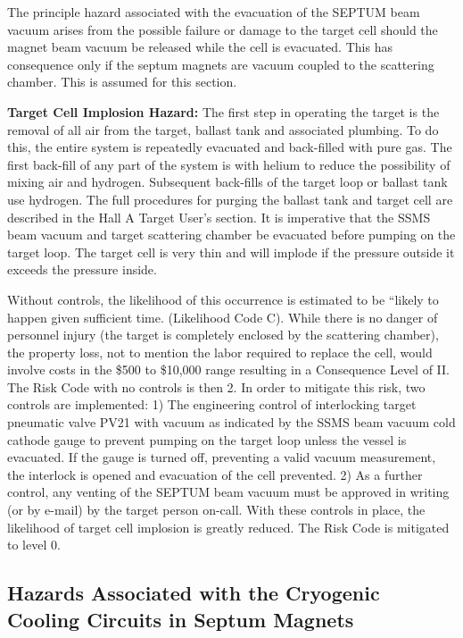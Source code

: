 The principle hazard associated with the evacuation of the SEPTUM beam vacuum arises from the possible 
failure or damage to the target cell should the magnet beam vacuum be released while the cell is evacuated. 
This has consequence only if the septum magnets are vacuum coupled to the scattering chamber. This is 
assumed for this section. 

{\bf Target Cell Implosion Hazard:}
The first step in operating the target is the removal of all air from the target, ballast tank and
associated plumbing. To do this, the entire system is repeatedly evacuated and back-filled with pure 
gas. The first back-fill of any part of the system is with helium to reduce the possibility of mixing 
air and hydrogen. Subsequent back-fills of the target loop or ballast tank use hydrogen. The full 
procedures for purging the ballast tank and target cell are described in the Hall A Target User's section. 
It is imperative that the SSMS beam vacuum and target scattering chamber be evacuated before pumping on 
the target loop. The target cell is very thin and will implode if the pressure outside it exceeds the 
pressure inside.

Without controls, the likelihood of this occurrence is estimated to be ``likely to happen given 
sufficient time. (Likelihood Code C).  While there is no danger of personnel injury (the target is 
completely enclosed by the scattering chamber), the property loss, not to mention the labor required 
to replace the cell, would involve costs in the \$500 to \$10,000 range resulting in a Consequence 
Level of II.  The Risk Code with no controls is then 2.  In order to mitigate this risk, two controls 
are implemented: 1) The engineering control of interlocking target pneumatic valve PV21 with vacuum 
as indicated by the SSMS  beam vacuum cold cathode gauge to prevent pumping on the target loop unless 
the vessel is evacuated.  If the gauge is turned off, preventing a valid vacuum measurement, the 
interlock is opened and evacuation of the cell prevented. 2) As a further control, any venting of 
the SEPTUM beam vacuum must be approved in writing (or by e-mail) by the target person on-call.  
With these controls in place, the likelihood of target cell implosion is greatly reduced.  The Risk 
Code is mitigated to level 0.

\begin{safetyen}{10}{15}
\subsection {\bf Hazards Associated with the Cryogenic Cooling Circuits in Septum Magnets}
\end{safetyen}


